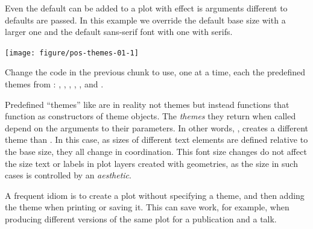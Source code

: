 \documentclass[krantz2]{krantz}\usepackage{knitr}%
\begin{document}
Even the default  can be added to a plot with effect is arguments different to defaults are passed. In this example we override the default base size with a larger one and the default sans-serif font with one with serifs.

\begin{knitrout}\footnotesize
{}\color{fgcolor}\begin{kframe}
\begin{alltt}
  \hlopt{+}
  \hlstd{()} \hlopt{+}
  \hlstd{(} \hlstd{=} \hlstd{,}
              \hlstd{=} \hlstd{)}
\end{alltt}
\end{kframe}

{\centering \texttt{[image: figure/pos-themes-01-1]} 

}



\end{knitrout}

\begin{playground}
Change the code in the previous chunk to use, one at a time, each the predefined themes from \ggplot: , , , , ,  and .
\end{playground}

\begin{explainbox}
Predefined ``themes'' like  are in reality not themes but instead \Rlang functions that function as constructors of theme objects. The \emph{themes} they return when called depend on the arguments to their parameters. In other words, , creates a different theme than . In this case, as sizes of different text elements are defined relative to the base size, they all change in coordination. This font size changes do not affect the size text or labels in plot layers created with geometries, as the size in such cases is controlled by an \emph{aesthetic}.
\end{explainbox}

A frequent idiom is to create a plot without specifying a theme, and then adding the theme when printing or saving it. This can save work, for example, when producing different versions of the same plot for a publication and a talk.
\end{document}
